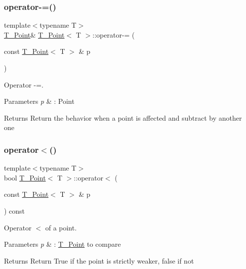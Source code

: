 \subsubsection{\texorpdfstring{operator-\/=()}{operator-=()}}
{\footnotesize\ttfamily template$<$typename T$>$ \\
\hyperlink{classT__Point}{T\+\_\+\+Point}\& \hyperlink{classT__Point}{T\+\_\+\+Point}$<$ T $>$\+::operator-\/= (\begin{DoxyParamCaption}\item[{const \hyperlink{classT__Point}{T\+\_\+\+Point}$<$ T $>$ \&}]{p }\end{DoxyParamCaption})\hspace{0.3cm}{\ttfamily [inline]}}



Operator -\/=. 


\begin{DoxyParams}{Parameters}
{\em p} & \+: Point \\
\hline
\end{DoxyParams}
\begin{DoxyReturn}{Returns}
Return the behavior when a point is affected and subtract by another one 
\end{DoxyReturn}
\mbox{\label{classT__Point_a95cb559fe5888b44481f6ad3aebabefe}} 
\subsubsection{\texorpdfstring{operator$<$()}{operator<()}}
{\footnotesize\ttfamily template$<$typename T$>$ \\
bool \hyperlink{classT__Point}{T\+\_\+\+Point}$<$ T $>$\+::operator$<$ (\begin{DoxyParamCaption}\item[{const \hyperlink{classT__Point}{T\+\_\+\+Point}$<$ T $>$ \&}]{p }\end{DoxyParamCaption}) const\hspace{0.3cm}{\ttfamily [inline]}}



Operator $<$ of a point. 


\begin{DoxyParams}{Parameters}
{\em p} & \+: \hyperlink{classT__Point}{T\+\_\+\+Point} to compare \\
\hline
\end{DoxyParams}
\begin{DoxyReturn}{Returns}
Return True if the point is strictly weaker, false if not 
\end{DoxyReturn}
\mbox{\label{classT__Point_a13fbb5646f2333aa41194d648423e10f}} 

